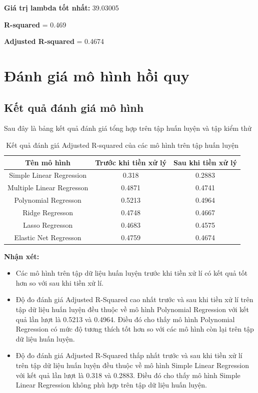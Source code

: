 \documentclass[runningheads]{llncs}
\begin{document}
\textbf{Giá trị lambda tốt nhất:} 39.03005

\textbf{R-squared} = 0.469

\textbf{Adjusted R-squared} = 0.4674 


\section{Đánh giá mô hình hồi quy}

\subsection{Kết quả đánh giá mô hình}

Sau đây là bảng kết quả đánh giá tổng hợp trên tập huấn luyện và tập kiểm thử

\begin{table}[H]
	\setlength{\tabcolsep}{0.5em}
	\renewcommand{\arraystretch}{1.2}
	\begin{center}
		\caption{Kết quả đánh giá Adjusted R-squared của các mô hình trên tập huấn luyện}\label{tab3}
		\begin{tabular}{|c|c|c|}
			\hline
			Tên mô hình&Trước khi tiền xử lý&Sau khi tiền xử lý\\
			\hline
			Simple Linear Regression&0.318&0.2883\\
			\hline
			Multiple Linear Regresson&0.4871&0.4741\\
			\hline
			Polynomial Regresson&0.5213&0.4964\\
			\hline
			Ridge Regresson&0.4748&0.4667\\
			\hline
			Lasso Regresson&0.4683&0.4575\\
			\hline
			Elastic Net Regresson&0.4759&0.4674\\
			\hline
		\end{tabular}			
	\end{center}
\end{table}

\textbf{Nhận xét:} 
\begin{itemize}
	\item Các mô hình trên tập dữ liệu huấn luyện trước khi tiền xử lí có kết quả tốt hơn so với sau khi tiền xử lí.
	\item Độ đo đánh giá Adjusted R-Squared cao nhất trước và sau khi tiền xử lí trên tập dữ liệu huấn luyện đều thuộc về mô hình Polynomial Regression với kết quả lần lượt  là 0.5213 và 0.4964. Điều đó cho thấy mô hình Polynomial Regression có mức độ tương thích tốt hơn so với các mô hình còn lại trên tập dữ liệu huấn luyện.
	\item Độ đo đánh giá Adjusted R-Squared thấp nhất trước và sau khi tiền xử lí trên tập dữ liệu huấn luyện đều thuộc về mô hình Simple Linear Regression với kết quả lần lượt là 0.318 và 0.2883. Điều đó cho thấy mô hình Simple Linear Regression không phù hợp trên tập dữ liệu huấn luyện. 
	
\end{itemize}
\end{document}
